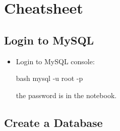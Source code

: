 \section{ Cheatsheet}

%

\subsection{Login to MySQL}

\begin{itemize}
    \item Login to MySQL console:
    \begin{mintedbox}{bash}
mysql -u root -p
    \end{mintedbox}
    the password is in the notebook.
\end{itemize}

\subsection{Create a Database}

